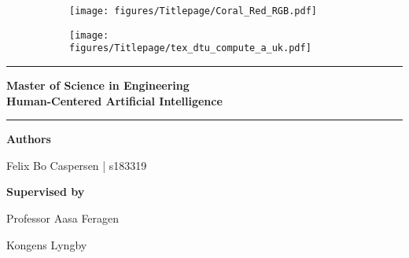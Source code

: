 \begin{titlepage}
    \begin{figure}[H]
         \centering
         \begin{subfigure}[H]{0.15 \textwidth}
             \centering
             \texttt{[image: figures/Titlepage/Coral\_Red\_RGB.pdf]}
         \end{subfigure}
         \hfill
         \begin{subfigure}[H]{0.45\textwidth}
             \texttt{[image: figures/Titlepage/tex\_dtu\_compute\_a\_uk.pdf]}
         \end{subfigure}
    \end{figure}
    \begin{center}
        \vspace{3 cm}
        \hrule
        \vspace{.3cm}
        { \huge {\bfseries {\opgavetitel}}
        } 
        
        \vspace{.1cm}
        { \LARGE {\bfseries 
            {
                Master of Science in Engineering
                \\
                Human-Centered Artificial Intelligence
            }
        }
        }
        \vspace{.5cm}
        
        \hrule
        \vspace{1.5cm}
        
        \textbf{Authors}\\
        \vspace{.5cm}
        \centering
        
        Felix Bo Caspersen | s183319\\
        
        \vspace{1.5cm}
        
        \textbf{Supervised by}\\
        \vspace{.5cm}
        \centering
        
        Professor Aasa Feragen \\
        \vspace{1.5cm}
        
        Kongens Lyngby \\
        \centering \datoen %
    \end{center}
\end{titlepage}